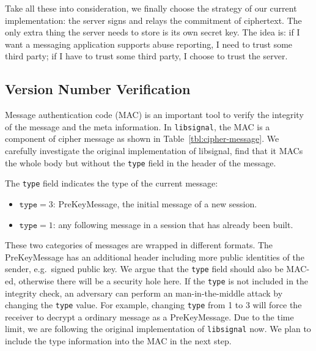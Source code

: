 Take all these into consideration, we finally choose the strategy of our current implementation:
the server signs and relays the commitment of ciphertext.
The only extra thing the server needs to store is its own secret key.
The idea is: if I want a messaging application supports abuse reporting, I need to trust some third party;
if I have to trust some third party, I choose to trust the server.

\subsection{Version Number Verification}
\label{sec:version_verify}
Message authentication code (MAC) is an important tool to verify the integrity of the message and the meta information.
In \texttt{libsignal}, the MAC is a component of cipher message as shown in Table~\ref{tbl:cipher-message}.
We carefully investigate the original implementation of libsignal,
find that it MACs the whole body but without the \texttt{type} field in the header of the message.

The \texttt{type} field indicates the type of the current message:
\begin{itemize}
\item $\texttt{type} = 3$: PreKeyMessage, the initial message of a new session.
\item $\texttt{type} = 1$: any following message in a session that has already been built.
\end{itemize}
These two categories of messages are wrapped in different formats.
The PreKeyMessage has an additional header including more public identities of the sender,
e.g.~signed public key.
We argue that the \texttt{type} field should also be MAC-ed,
otherwise there will be a security hole here.
If the \texttt{type} is not included in the integrity check,
an adversary can perform an man-in-the-middle attack by changing the \texttt{type} value.
For example, changing \texttt{type} from 1 to 3 will force the receiver to decrypt a ordinary message as a PreKeyMessage.
Due to the time limit, we are following the original implementation of \texttt{libsignal} now.
We plan to include the type information into the MAC in the next step.

